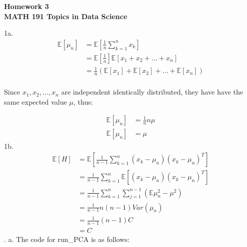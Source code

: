 \documentclass[12pt]{article}
\begin{document}
\begin{center}
{\bf Homework 3}\\
{\bf MATH 191 Topics in Data Science}\\
\end{center}

1a. 
\begin{align} \nonumber
\mathbb{E}[\mu_n] &= \mathbb{E}[\frac{1}{n}\sum_{k=1}^nx_k] \\ \nonumber
&= \mathbb{E}[\frac{1}{n}]\mathbb{E}[x_1 + x_2 + \dots + x_n] \\ \nonumber
&= \frac{1}{n}(\mathbb{E}[x_1] + \mathbb{E}[x_2] + \dots + \mathbb{E}[x_n]) \\ \nonumber
\end{align}
\begin{center}
Since $x_1, x_2, \dots, x_n$ are independent identically distributed, they have have the same expected value $\mu$, thus:
\end{center}
\begin{align} \nonumber
\mathbb{E}[\mu_n] &= \frac{1}{n}n\mu \\ \nonumber
\mathbb{E}[\mu_n] &= \mu
\end{align}
1b. 
\begin{align} \nonumber
\mathbb{E}[H] &= \mathbb{E}[\frac{1}{n-1} \sum_{k=1}^n (x_k - \mu_n) (x_k - \mu_n)^T] \\ \nonumber
&= \frac{1}{n-1} \sum_{k=1}^n \mathbb{E}[(x_k - \mu_n) (x_k - \mu_n)^T] \\ \nonumber
&= \frac{1}{n-1} \sum_{k=1}^n\sum_{j=1}^{n-1} (\mathbb{E}\mu_n^2 - \mu^2) \\ \nonumber
&= \frac{1}{n-1} n(n-1)Var(\mu_n) \\ \nonumber
&= \frac{1}{n-1} (n-1)C \\ \nonumber
&= C
\end{align}
. 
a. The code for run\_PCA is as follows:
\end{document}
